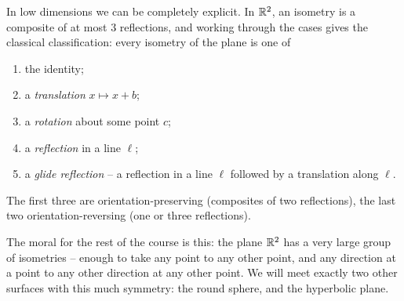 \documentclass[a4paper]{scrartcl}
\begin{document}
In low dimensions we can be completely explicit. In $\mathbb{R}^2$, an isometry is a composite of at most $3$ reflections, and working through the cases gives the classical classification: every isometry of the plane is one of
\begin{enumerate}[label=(\roman*)]
    \item the identity;
    \item a \emph{translation} $x \mapsto x + b$;
    \item a \emph{rotation} about some point $c$;
    \item a \emph{reflection} in a line $\ell$;
    \item a \emph{glide reflection} -- a reflection in a line $\ell$ followed by a translation along $\ell$.
\end{enumerate}
The first three are orientation-preserving (composites of two reflections), the last two orientation-reversing (one or three reflections).
\begin{center}
\end{center}

The moral for the rest of the course is this: the plane $\mathbb{R}^2$ has a very large group of isometries -- enough to take any point to any other point, and any direction at a point to any other direction at any other point. We will meet exactly two other surfaces with this much symmetry: the round sphere, and the hyperbolic plane.
\end{document}
